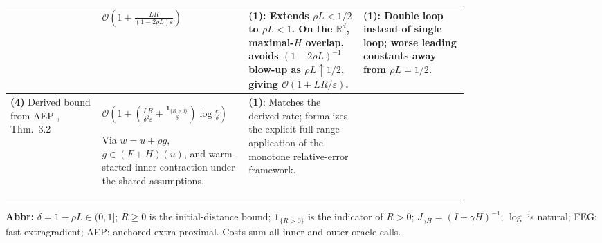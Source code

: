 \begin{table}[tp]
\begin{threeparttable}
\begin{tabularx}{\linewidth}{@{}>{\raggedright\arraybackslash}p{0.20\linewidth}>{\raggedright\arraybackslash}p{0.32\linewidth}>{\raggedright\arraybackslash}p{0.25\linewidth}>{\raggedright\arraybackslash}X@{}}
& $\mathcal{O}\!\left(1+\frac{LR}{(1-2\rho L)\varepsilon}\right)$
& \textbf{(1)}: Extends $\rho L<1/2$ to $\rho L<1$. On the $\mathbb{R}^d$, maximal-$H$ overlap, avoids $(1-2\rho L)^{-1}$ blow-up as $\rho L\uparrow1/2$, giving $\mathcal{O}(1+LR/\varepsilon)$.
& \textbf{(1)}: Double loop instead of single loop; worse leading constants away from $\rho L=1/2$. \\
\midrule
\textbf{(4)} Derived bound from AEP \citep{cohypJYv1}, Thm.~3.2
& $\mathcal{O}\!\left(1+\left(\frac{LR}{\delta^2\varepsilon}+\frac{\mathbf{1}_{\{R>0\}}}{\delta}\right)\log\frac{e}{\delta}\right)$\par
Via $w=u+\rho g$, $g\in(F+H)(u)$, and warm-started inner contraction under the shared assumptions.
& \textbf{(1)}: Matches the derived rate; formalizes the explicit full-range application of the monotone relative-error framework.
& \\
\bottomrule
\end{tabularx}
\begin{tablenotes}[flushleft]\footnotesize
\item[] \textbf{Abbr:} $\delta=1-\rho L\in(0,1]$; $R\geq0$ is the initial-distance bound; $\mathbf{1}_{\{R>0\}}$ is the indicator of $R>0$; $J_{\gamma H}=(I+\gamma H)^{-1}$; $\log$ is natural; FEG: fast extragradient; AEP: anchored extra-proximal. Costs sum all inner and outer oracle calls.
\end{tablenotes}
\end{threeparttable}
\end{table}
\clearpage
